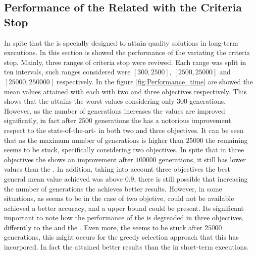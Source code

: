 \begin{figure}[t]
\centering

\label{fig:Diversity_WFG1}
\end{figure}


\begin{figure}[t]
\centering

\label{fig:Diversity_WFG5}
\end{figure}


\begin{figure}[t]
\centering

\label{fig:Diversity_WFG6}
\end{figure}


\subsection{Performance of the \MOEAS{} Related with the Criteria Stop}

In spite that the \VSDMOEA{} is specially designed to attain quality solutions in long-term executions.
%
In this section is showed the performance of the \MOEAS{} variating the criteria stop.
%
Mainly, three ranges of criteria stop were reviwed.
%
Each range was split in ten intervals, such ranges considered were $[300, 2500]$, $[2500, 25000]$ and $[25000, 250000]$ respectively.
%
In the figure \ref{fig:Performance_time} are showed the mean \HV{} values attained with each \MOEA{} with two and three objectives respectively.
%
This shows that the \VSDMOEA{} attains the worst \HV{} values considering only $300$ generations.
%
However, as the number of generations increases the \HV{} values are improved significatly, in fact after $2500$ generations the \VSDMOEA{} has a notorious improvement respect to the state-of-the-art-\MOEAS{} in both two and three objectives.
%
It can be seen that as the maximum number of generations is higher than $25000$ the remaining \MOEAS{} seems to be stuck, specifically considering two objectives.
%
In spite that in three objectives the \RMOEA{} shows an improvement after $100000$ generations, it still has lower values than the \VSDMOEA{}.
%
In addition, taking into account three objectives the best general mean value achieved was above $0.9$, there is still possible that increasing the number of generations the \VSDMOEA{} achieves better results.
%
However, in some situations, as seems to be in the case of two objetive, could not be available achieved a better accuracy, and a upper bound could be present.
%
Its significant important to note how the performance of the \NSGAII{} is degreaded in three objectives, differntly to the \RMOEA{} and the \MOEAD{}.
%
Even more, the \MOEAD{} seems to be stuck after $25000$ generations, this might occurs for the greedy selection approach that this \MOEA{} has incorpored.
%
In fact the \MOEAD{} attained better results than the \RMOEA{} in short-term executions.
%

